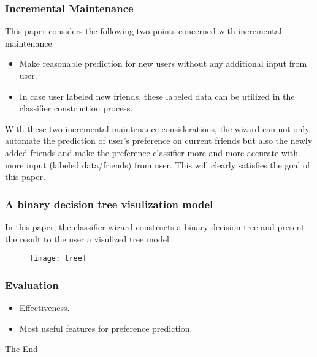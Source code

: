 \documentclass{beamer}
\begin{document}
%
\begin{frame}
\frametitle{Incremental Maintenance}
This paper considers the following two points concerned with
incremental maintenance:\\
\begin{itemize}
\item Make reasonable prediction for new users without any additional
  input from user. 
\item In case user labeled new friends, these labeled data can be
  utilized in the classifier construction process. 
\end{itemize}
With these two incremental maintenance considerations, the wizard can
not only automate the prediction of user's preference on current
friends but also the newly added friends and make the preference
classifier more and more accurate with more input (labeled
data/friends) from user. This will clearly satisfies the goal of this
paper.  
\end{frame}
%
\begin{frame}
\frametitle{A binary decision tree visulization model}
In this paper, the classifier wizard constructs a binary decision tree
and present the result to the user a visulized tree model. 
\begin{figure}
\texttt{[image: tree]} %
\end{figure}
\end{frame}

%
\begin{frame}
\frametitle{Evaluation}
\begin{itemize}
  \item Effectiveness.
  \item Most useful features for preference prediction. 
\end{itemize}
\end{frame}


\begin{frame}
\centerline{The End}
\end{frame}
\end{document}
